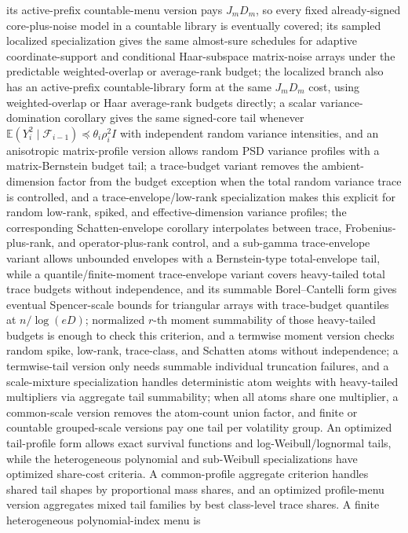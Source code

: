 \documentclass[11pt]{article}
\begin{document}
its active-prefix countable-menu version pays \(J_mD_m\), so every fixed
already-signed core-plus-noise model in a countable library is eventually
covered;
its sampled localized specialization gives the same almost-sure schedules for
adaptive coordinate-support and conditional Haar-subspace matrix-noise arrays
under the predictable weighted-overlap or average-rank budget;
the localized branch also has an active-prefix countable-library form at the
same \(J_mD_m\) cost, using weighted-overlap or Haar average-rank budgets
directly;
a scalar variance-domination corollary gives the same signed-core tail whenever
\(\mathbb E(Y_i^2\mid\mathcal F_{i-1})\preceq\theta_i\rho_i^2I\) with
independent random variance intensities, and an anisotropic matrix-profile
version allows random PSD variance profiles with a matrix-Bernstein budget tail;
a trace-budget variant removes the ambient-dimension factor from the budget
exception when the total random variance trace is controlled, and a
trace-envelope/low-rank specialization makes this explicit for random
low-rank, spiked, and effective-dimension variance profiles; the corresponding
Schatten-envelope corollary interpolates between trace, Frobenius-plus-rank,
and operator-plus-rank control, and a sub-gamma trace-envelope variant allows
unbounded envelopes with a Bernstein-type total-envelope tail, while a
quantile/finite-moment trace-envelope variant covers heavy-tailed total trace
budgets without independence, and its summable Borel--Cantelli form gives
eventual Spencer-scale bounds for triangular arrays with trace-budget quantiles
at \(n/\log(eD)\); normalized \(r\)-th moment summability of those heavy-tailed
budgets is enough to check this criterion, and a termwise moment version checks
random spike, low-rank, trace-class, and Schatten atoms without independence;
a termwise-tail version only needs summable individual truncation failures, and
a scale-mixture specialization handles deterministic atom weights with
heavy-tailed multipliers via aggregate tail summability; when all atoms share
one multiplier, a common-scale version removes the atom-count union factor,
and finite or countable grouped-scale versions pay one tail per volatility
group.  An optimized tail-profile form allows exact survival functions and
log-Weibull/lognormal tails, while the heterogeneous polynomial and sub-Weibull
specializations have optimized share-cost criteria.  A common-profile aggregate
criterion handles shared tail shapes by proportional mass shares, and an
optimized profile-menu version aggregates mixed tail families by best
class-level trace shares.  A finite heterogeneous polynomial-index menu is
\end{document}
